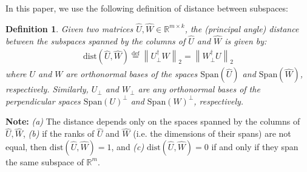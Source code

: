 \documentclass[11pt]{article}
\theoremstyle{plain}
\newtheorem{definition}[theorem]{Definition}
\theoremstyle{definition}
\newcommand{\eqdef}{\stackrel{\textrm{def}}{=}}
\newcommand{\dist}{\mathrm{dist}}
\newcommand{\twonorm}[1]{\left\| {#1} \right\|_2}
\begin{document}
In this paper, we use the following definition of distance between subspaces:
\begin{definition}\cite{GolVan96}\label{defn:dist}
  Given two matrices $\widehat{U},\widehat{W}\in \mathbb{R}^{m\times k}$, the (principal angle) distance between the subspaces spanned by the columns of $\widehat{U}$ and $\widehat{W}$ is given by:
\begin{align*}
  \dist\left(\widehat{U},\widehat{W}\right) \eqdef \twonorm{U_{\perp}^\dag W} = \twonorm{W_{\perp}^\dag U}
\end{align*}
where $U$ and $W$ are orthonormal bases of the spaces $\textrm{Span}\left(\widehat{U}\right)$ and $\textrm{Span}\left(\widehat{W}\right)$, respectively. Similarly, $U_{\perp}$ and $W_{\perp}$ are any orthonormal bases of the perpendicular spaces $\textrm{Span}\left(U\right)^{\perp}$ and $\textrm{Span}\left(W\right)^{\perp}$, respectively.
\end{definition}
{\bf Note:} {\em (a)} The distance depends only on the spaces spanned by the columns of $\widehat{U},\widehat{W}$, {\em (b)}
if the ranks of $\widehat{U}$ and $\widehat{W}$ (i.e. the dimensions of their spans) are not equal, then $\dist\left(\widehat{U},\widehat{W}\right) = 1$, and {\em (c)} $\dist\left(\widehat{U},\widehat{W}\right) = 0$ if and only if they span the same subspace of $\mathbb{R}^m$.
\end{document}
